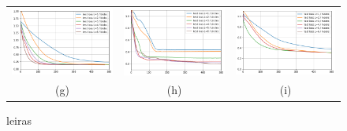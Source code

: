 \documentclass[12pt, a4paper,  nobibnotes]{article}
\begin{document}
\begin{figure}[H]
\begin{tabular}{ccc}
      \includegraphics[width=\thisfigurewidth\textwidth]{figures/test_loss_blobs_lr=0_001.png} & 
      \includegraphics[width=\thisfigurewidth\textwidth]{figures/test_loss_circles_lr=0_1.png} &
      \includegraphics[width=\thisfigurewidth\textwidth]{figures/test_loss_moons_lr=0_001.png} \\
      (g) & (h) & (i) \\[6.5pt]
    \end{tabular}
    \caption{leiras}
    \label{fig:exactdiagonalization}
\end{figure}
\end{document}
